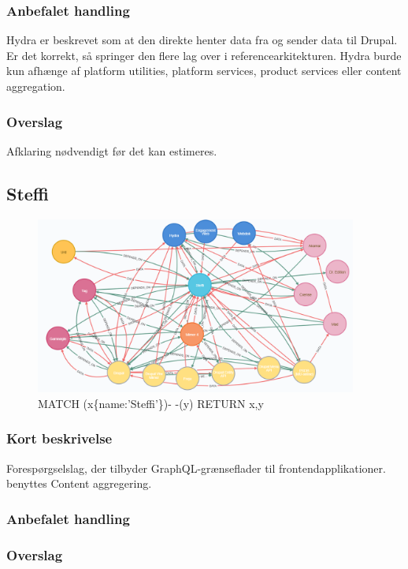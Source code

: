 \documentclass{article}
\begin{document}
\subsubsection{Anbefalet handling}
Hydra er beskrevet som at den direkte henter data fra og sender data til Drupal. Er det korrekt, så springer den flere lag over i referencearkitekturen.
Hydra burde kun afhænge af platform utilities, platform services, product services eller content aggregation.
\subsubsection{Overslag}
Afklaring nødvendigt før det kan estimeres.


\subsection{Steffi}
\begin{figure}[h]
\includegraphics[width=300pt]{Steffi.PNG}
\caption{MATCH (x\{name:'Steffi'\})- -(y) RETURN x,y}
\end{figure}
\subsubsection{Kort beskrivelse}
Forespørgselslag, der tilbyder GraphQL-grænseflader til frontendapplikationer.
benyttes Content aggregering.
\subsubsection{Anbefalet handling}
\subsubsection{Overslag}
\end{document}
